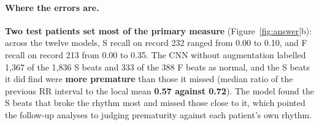 \documentclass[10pt,a4paper]{article}
\begin{document}
\paragraph{Where the errors are.} \textbf{Two test patients set most of the primary measure} (Figure~\ref{fig:answer}b): across the twelve
models, S recall on record 232 ranged from 0.00 to 0.10, and F recall on record 213 from 0.00 to 0.35. The CNN without augmentation
labelled 1,367 of the 1,836 S beats and 333 of the 388 F beats as normal, and the S beats it did find were \textbf{more premature} than those
it missed (median ratio of the previous RR interval to the local mean \textbf{0.57 against 0.72}). The model found the S beats that broke the
rhythm most and missed those close to it, which pointed the follow-up analyses to judging prematurity against each patient's own
rhythm.

\begin{table}[tbp]\centering\footnotesize
\caption{The pre-registered comparison: the 22 test patients, read once. Rare-class macro-F1 with 95\% intervals from a bootstrap over
patients, and the recall of normal beats; the strength $s$ is the fraction of the N count chosen on validation.}\label{tab:test}\end{table}

\begin{table}[tbp]\centering\footnotesize{}
\caption{The registered hypotheses, their verdicts (the rules applied as written) and the evidence.}\label{tab:hypotheses}\end{table}
\end{document}

